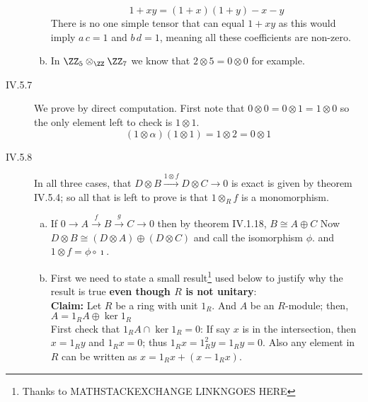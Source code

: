 \begin{description}
\begin{enumerate}[(a)]
            $$1+xy= (1+x)(1+y) - x - y$$
            There is no one simple tensor that can equal $1+xy$ as this would imply $a\,c=1$ and $b\,d=1$, meaning all these coefficients are non-zero.
        \item In $\ZZ_5\otimes_\ZZ \ZZ_7$ we know that $2\otimes 5=0\otimes 0$ for example.
    \end{enumerate}
\item[IV.5.7] We prove by direct computation. First note that $0\otimes 0 = 0\otimes 1 = 1\otimes 0$ so the only element left to check is $1\otimes 1$.
    $$(1\otimes\alpha)(1\otimes 1) = 1\otimes 2 = 0\otimes 1$$
\item[IV.5.8]
    In all three cases, that $D\otimes B \xrightarrow{1\otimes f} D\otimes C \to 0$ is exact is given by theorem IV.5.4; so all that is left to prove is that $1\otimes_R f$ is a monomorphism.
    \begin{enumerate}[(a)]
        \item If $0\to A \xrightarrow{f} B\xrightarrow{g} C \to 0$ then by theorem IV.1.18, $B\cong A\oplus C$  Now $D\otimes B\cong (D\otimes A)\oplus(D\otimes C)$ and call the isomorphism $\phi$. and $1\otimes f = \phi \circ \imath$. 
        \item First we need to state a small result\footnote{Thanks to MATHSTACKEXCHANGE LINKNGOES HERE} used below to justify why the result is true \textbf{even though $R$ is not unitary}: \\
            \textbf{Claim:} Let $R$ be a ring with unit $1_R$. And $A$ be an $R$-module; then, $A=1_RA\oplus \ker 1_R$\\
            First check that $1_RA\cap \ker 1_R= 0$: If say $x$ is in the intersection, then $x=1_Ry$ and $1_Rx=0$; thus $1_Rx=1_R^2y=1_Ry =0$. Also any element in $R$ can be written as $x=1_Rx + (x-1_Rx)$.


\end{enumerate}
\end{description}
